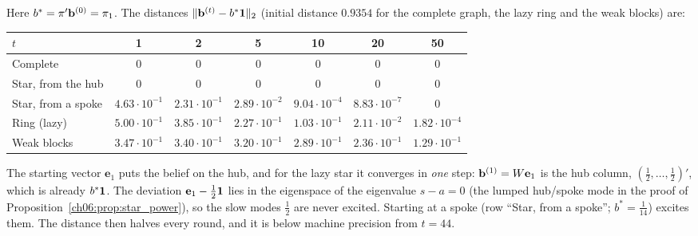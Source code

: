 \documentclass[../solutions_manual.tex]{subfiles}
\begin{document}
 Here $b^* = \pi'\mathbf{b}^{(0)} = \pi_1$. The distances $\|\mathbf{b}^{(t)} - b^*\mathbf{1}\|_2$ (initial distance $0.9354$ for the complete graph, the lazy ring and the weak blocks) are:
\begin{center}
\footnotesize
\setlength{\tabcolsep}{4pt}
\begin{tabular}{lcccccc}
\toprule
$t$ & 1 & 2 & 5 & 10 & 20 & 50 \\
\midrule
Complete & 0 & 0 & 0 & 0 & 0 & 0 \\
Star, from the hub & 0 & 0 & 0 & 0 & 0 & 0 \\
Star, from a spoke & $4.63\cdot10^{-1}$ & $2.31\cdot10^{-1}$ & $2.89\cdot10^{-2}$ & $9.04\cdot10^{-4}$ & $8.83\cdot10^{-7}$ & $0$ \\
Ring (lazy) & $5.00\cdot10^{-1}$ & $3.85\cdot10^{-1}$ & $2.27\cdot10^{-1}$ & $1.03\cdot10^{-1}$ & $2.11\cdot10^{-2}$ & $1.82\cdot10^{-4}$ \\
Weak blocks & $3.47\cdot10^{-1}$ & $3.40\cdot10^{-1}$ & $3.20\cdot10^{-1}$ & $2.89\cdot10^{-1}$ & $2.36\cdot10^{-1}$ & $1.29\cdot10^{-1}$ \\
\bottomrule
\end{tabular}
\end{center}
The starting vector $\mathbf{e}_1$ puts the belief on the hub, and for the lazy star it converges in \emph{one} step: $\mathbf{b}^{(1)} = W\mathbf{e}_1$ is the hub column, $(\frac12, \ldots, \frac12)'$, which is already $b^*\mathbf{1}$. The deviation $\mathbf{e}_1 - \frac12\mathbf{1}$ lies in the eigenspace of the eigenvalue $s - a = 0$ (the lumped hub/spoke mode in the proof of Proposition~\ref{ch06:prop:star_power}), so the slow modes $\frac12$ are never excited. Starting at a spoke (row ``Star, from a spoke''; $b^* = \frac{1}{14}$) excites them. The distance then halves every round, and it is below machine precision from $t = 44$.
\end{document}
